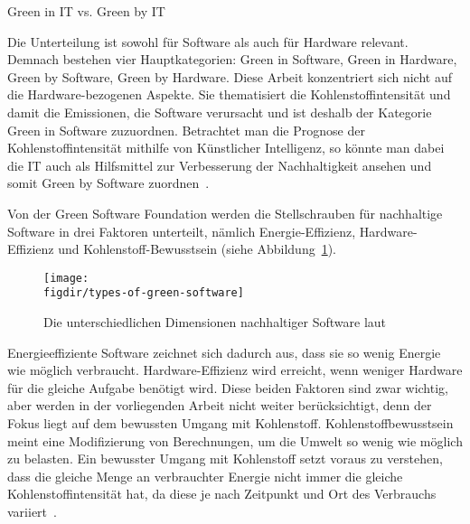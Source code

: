 \begin{table}[t]
 \centering\small
 \caption{Green in IT vs. Green by IT}
 \label{tab:GreenInByIT}
 
\end{table}

Die Unterteilung ist sowohl für Software als auch für Hardware relevant.
Demnach bestehen vier Hauptkategorien:
Green in Software, Green in Hardware, Green by Software, Green by Hardware.
Diese Arbeit konzentriert sich nicht auf die Hardware-bezogenen Aspekte.
Sie thematisiert die Kohlenstoffintensität und damit die Emissionen, die Software verursacht und ist deshalb der Kategorie Green in Software zuzuordnen.
Betrachtet man die Prognose der Kohlenstoffintensität mithilfe von Künstlicher Intelligenz, so könnte man dabei die \ac{IT} auch als Hilfsmittel zur Verbesserung der Nachhaltigkeit ansehen und somit Green by Software zuordnen~\cite{Calero.2015}.

Von der Green Software Foundation werden die Stellschrauben für nachhaltige Software in drei Faktoren unterteilt, nämlich Energie-Effizienz, Hardware-Effizienz und Kohlenstoff-Bewusstsein (siehe Abbildung~\ref{FIG:types-green-software}).
\begin{figure}
 \caption{Die unterschiedlichen Dimensionen nachhaltiger Software laut~\cite{GreenSoftwareFoundation.20240316T16:54:58.000Z}}
 {\texttt{[image: \\figdir/types-of-green-software]}}
 \label{FIG:types-green-software}
\end{figure}
Energieeffiziente Software zeichnet sich dadurch aus, dass sie so wenig Energie wie möglich verbraucht.
Hardware-Effizienz wird erreicht, wenn weniger Hardware für die gleiche Aufgabe benötigt wird.
Diese beiden Faktoren sind zwar wichtig, aber werden in der vorliegenden Arbeit nicht weiter berücksichtigt, denn der Fokus liegt auf dem bewussten Umgang mit Kohlenstoff.
Kohlenstoffbewusstsein meint eine Modifizierung von Berechnungen, um die Umwelt so wenig wie möglich zu belasten.
Ein bewusster Umgang mit Kohlenstoff setzt voraus zu verstehen, dass die gleiche Menge an verbrauchter Energie nicht immer die gleiche Kohlenstoffintensität hat, da diese je nach Zeitpunkt und Ort des Verbrauchs variiert~\cite{GreenSoftwareFoundation.2022}.

